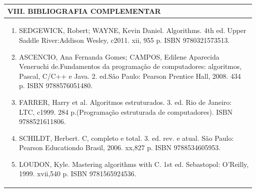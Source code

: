 \documentclass[12pt]{article}
\begin{document}

\begin{longtable}{|L{1.025\textwidth}|} \hline
%
{\bf VIII. BIBLIOGRAFIA COMPLEMENTAR} \\ \hline
\begin{enumerate}

\item SEDGEWICK, Robert; WAYNE, Kevin Daniel. Algorithms. 4th ed. Upper Saddle River:Addison Wesley, c2011. xii, 955 p. ISBN 9780321573513.
\item ASCENCIO, Ana Fernanda Gomes; CAMPOS, Edilene Aparecida Veneruchi de.Fundamentos da programação de computadores: algoritmos, Pascal, C/C++ e Java. 2. ed.São Paulo: Pearson Prentice Hall, 2008. 434 p. ISBN 9788576051480.
\item FARRER, Harry et al. Algoritmos estruturados. 3. ed. Rio de Janeiro: LTC, c1999. 284 p.(Programação estruturada de computadores). ISBN 9788521611806.
\item SCHILDT, Herbert. C, completo e total. 3. ed. rev. e atual. São Paulo: Pearson Educationdo Brasil, 2006. xx,827 p. ISBN 9788534605953.
\item LOUDON, Kyle. Mastering algorithms with C. 1st ed. Sebastopol: O’Reilly, 1999. xvii,540 p. ISBN 9781565924536.


%
\end{enumerate}
 \\ \hline
\end{longtable}



\end{document}
